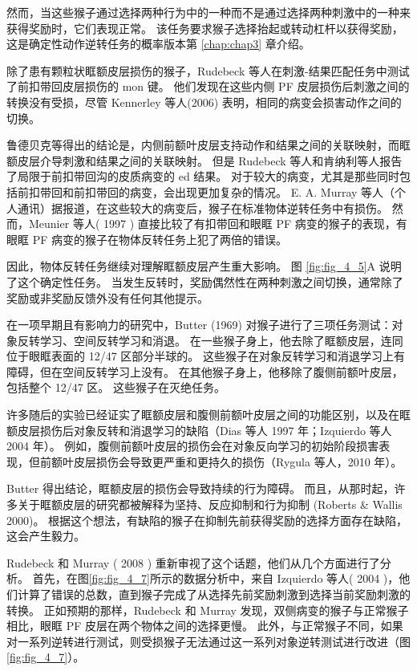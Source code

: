 然而，当这些猴子通过选择两种行为中的一种而不是通过选择两种刺激中的一种来获得奖励时，它们表现正常。
该任务要求猴子选择抬起或转动杠杆以获得奖励，这是确定性动作逆转任务的概率版本第 \ref{chap:chap3} 章介绍。\par


除了患有颗粒状眶额皮层损伤的猴子，Rudebeck 等人在刺激-结果匹配任务中测试了前扣带回皮层损伤的 mon 键。
他们发现在这些内侧 PF 皮层损伤后刺激之间的转换没有受损，尽管 Kennerley 等人(2006) 表明，相同的病变会损害动作之间的切换。\par



鲁德贝克等得出的结论是，内侧前额叶皮层支持动作和结果之间的关联映射，而眶额皮层介导刺激和结果之间的关联映射。
但是 Rudebeck 等人和肯纳利等人报告了局限于前扣带回沟的皮质病变的 ed 结果。
对于较大的病变，尤其是那些同时包括前扣带回和前扣带回的病变，会出现更加复杂的情况。
E. A. Murray 等人（个人通讯）据报道，在这些较大的病变后，猴子在标准物体逆转任务中有损伤。
然而，Meunier 等人( 1997 ) 直接比较了有扣带回和眼眶 PF 病变的猴子的表现，有眼眶 PF 病变的猴子在物体反转任务上犯了两倍的错误。  \par


因此，物体反转任务继续对理解眶额皮层产生重大影响。
图 \ref{fig:fig_4_5}A 说明了这个确定性任务。
当发生反转时，奖励偶然性在两种刺激之间切换，通常除了奖励或非奖励反馈外没有任何其他提示。\par


在一项早期且有影响力的研究中，Butter (1969) 对猴子进行了三项任务测试：对象反转学习、空间反转学习和消退。
在一些猴子身上，他去除了眶额皮层，连同位于眼眶表面的 12/47 区部分半球的。
这些猴子在对象反转学习和消退学习上有障碍，但在空间反转学习上没有。
在其他猴子身上，他移除了腹侧前额叶皮层，包括整个 12/47 区。
这些猴子在灭绝任务。\par


许多随后的实验已经证实了眶额皮层和腹侧前额叶皮层之间的功能区别，以及在眶额皮层损伤后对象反转和消退学习的缺陷（Dias 等人 1997 年；Izquierdo 等人 2004 年）。
例如，腹侧前额叶皮层的损伤会在对象反向学习的初始阶段损害表现，但前额叶皮层损伤会导致更严重和更持久的损伤（Rygula 等人，2010 年）。\par


Butter 得出结论，眶额皮层的损伤会导致持续的行为障碍。
而且，从那时起，许多关于眶额皮层的研究都被解释为坚持、反应抑制和行为抑制 (Roberts \& Wallis 2000)。
根据这个想法，有缺陷的猴子在抑制先前获得奖励的选择方面存在缺陷，这会产生毅力。\par


Rudebeck 和 Murray ( 2008 ) 重新审视了这个话题，他们从几个方面进行了分析。
首先，在图\ref{fig:fig_4_7}所示的数据分析中，来自 Izquierdo 等人( 2004 )，他们计算了错误的总数，直到猴子完成了从选择先前奖励刺激到选择当前奖励刺激的转换。
正如预期的那样，Rudebeck 和 Murray 发现，双侧病变的猴子与正常猴子相比，眼眶 PF 皮层在两个物体之间的选择更慢。
此外，与正常猴子不同，如果对一系列逆转进行测试，则受损猴子无法通过这一系列对象逆转测试进行改进（图\ref{fig:fig_4_7}）。\par


